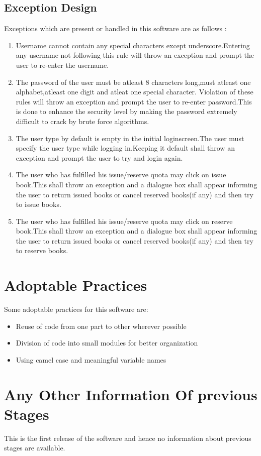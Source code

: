 \documentclass[a4paper]{article}
\begin{document}
\subsection{Exception Design}
Exceptions which are present or handled in this software are as follows :
\begin{enumerate}
\item Username cannot contain any special characters except underscore.Entering any username not following this rule will throw an exception and prompt the user to re-enter the username.
\item The password of the user must be atleast 8 characters long,must  atleast one alphabet,atleast one digit and atleat one special character. Violation of these rules will throw an exception and prompt the user to re-enter password.This is done to enhance the security level by making the password extremely difficult to crack by brute force algorithms.
\item The user type by default is empty in the initial  loginscreen.The user must specify the user type while logging in.Keeping it default shall throw an exception and prompt the user to try and login again.
\item The user who has fulfilled his issue/reserve quota may click on issue book.This shall throw an exception and a dialogue box shall appear informing the user to return issued books or cancel reserved books(if any) and then try to issue books.
\item The user who has fulfilled his issue/reserve quota may click on reserve book.This shall throw an exception and a dialogue box shall appear informing the user to return issued books or cancel reserved books(if any) and then try to reserve books.
\end{enumerate}
\section{Adoptable Practices}
Some adoptable practices for this software are:
\begin{itemize}
\item Reuse of code from one part to other wherever possible
\item Division of code into small modules for better organization
\item Using camel case and meaningful variable names
\end{itemize}
\section{Any Other Information Of previous Stages}
This is the first release of the software and hence no information about previous stages are
available.
\end{document}
